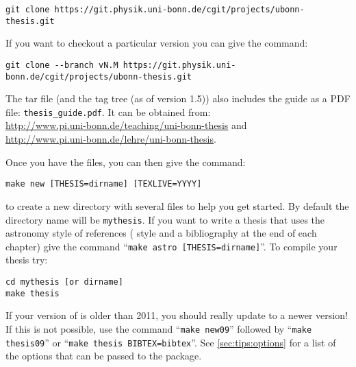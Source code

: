 {\small
\begin{verbatim}
git clone https://git.physik.uni-bonn.de/cgit/projects/ubonn-thesis.git
\end{verbatim}
}
\noindent
If you want to checkout a particular version you can give the command:
{\small
\begin{verbatim}
git clone --branch vN.M https://git.physik.uni-bonn.de/cgit/projects/ubonn-thesis.git
\end{verbatim}
}
\noindent
The tar file (and the tag tree (as of version 1.5)) also includes
the guide as a PDF file: \texttt{thesis\_guide.pdf}.  It can be
obtained from:\\
\url{http://www.pi.uni-bonn.de/teaching/uni-bonn-thesis}
and\\
\url{http://www.pi.uni-bonn.de/lehre/uni-bonn-thesis}.

\par\noindent
Once you have the files, you can then give the command:
\begin{verbatim}
make new [THESIS=dirname] [TEXLIVE=YYYY]
\end{verbatim}
to create a new directory with several files to help you get
started. By default the directory name will be \texttt{mythesis}.
If you want to write a thesis that uses the astronomy style of references
( style and a bibliography at the end of each chapter)
give the command \enquote{\texttt{make astro [THESIS=dirname]}}.
To compile your thesis try:
\begin{verbatim}
cd mythesis [or dirname]
make thesis
\end{verbatim}
If your version of \TeXLive is older than 2011,
you should really update to a newer version!
If this is not possible, use the command \enquote{\texttt{make new09}}
followed by \enquote{\texttt{make thesis09}}
or \enquote{\texttt{make thesis BIBTEX=bibtex}}.
See \cref{sec:tips:options} for a list of the options that can be passed to the package.

